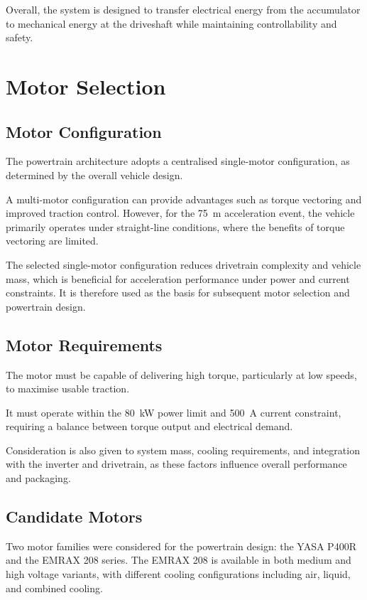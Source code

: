 Overall, the system is designed to transfer electrical energy from the accumulator to mechanical energy at the driveshaft while maintaining controllability and safety.


\section{Motor Selection}

\subsection{Motor Configuration}

The powertrain architecture adopts a centralised single-motor configuration, as determined by the overall vehicle design.

A multi-motor configuration can provide advantages such as torque vectoring and improved traction control. However, for the \SI{75}{\meter} acceleration event, the vehicle primarily operates under straight-line conditions, where the benefits of torque vectoring are limited.

The selected single-motor configuration reduces drivetrain complexity and vehicle mass, which is beneficial for acceleration performance under power and current constraints. It is therefore used as the basis for subsequent motor selection and powertrain design.

\subsection{Motor Requirements}

The motor must be capable of delivering high torque, particularly at low speeds, to maximise usable traction.

It must operate within the \SI{80}{\kilo\watt} power limit and \SI{500}{\ampere} current constraint, requiring a balance between torque output and electrical demand.

Consideration is also given to system mass, cooling requirements, and integration with the inverter and drivetrain, as these factors influence overall performance and packaging.

\subsection{Candidate Motors}

Two motor families were considered for the powertrain design: the YASA P400R \cite{YASA_P400R_data_sheet} and the EMRAX 208 series\cite{EMRAX_208_data_sheet}. 
The EMRAX 208 is available in both medium and high voltage variants, with different cooling configurations including air, liquid, and combined cooling.

